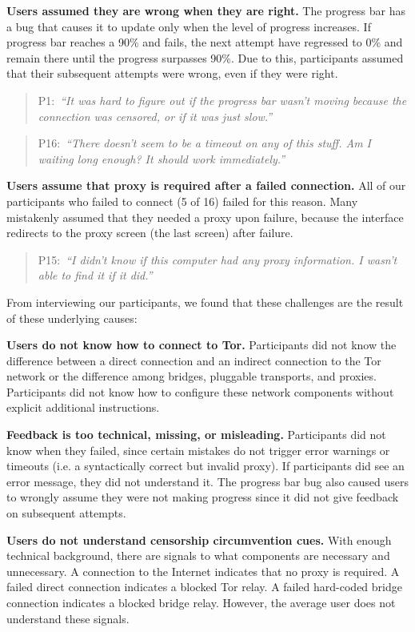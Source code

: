 \documentclass[USenglish,oneside,twocolumn]{article}
\newcommand{\pquote}[2]{
\begin{quotation}
\noindent #1:~\textit{``#2''}
\end{quotation}
}
\begin{document}
{\begin{description}
\item {\bfseries Users assumed they are wrong when they are right.}
The progress bar has a bug that causes it to update only when the level of progress increases.
If progress bar reaches a 90\% and fails, the next attempt have regressed to 0\% and remain there until the progress surpasses 90\%. Due to this, participants assumed that their subsequent attempts were wrong, even if they were right.

\smallskip
\pquote{P1}{It was hard to figure out if the progress bar wasn't moving because the connection was censored, or if it was just slow.}
\smallskip
\pquote{P16}{There doesn't seem to be a timeout on any of this stuff. Am I waiting long enough? It should work immediately.}
\smallskip

\item {\bfseries Users assume that proxy is required after a failed connection.}
All of our participants who failed to connect (5 of 16) failed for this reason. Many mistakenly assumed that they needed a proxy upon failure, because the interface redirects to the proxy screen (the last screen) after failure. 

\smallskip
\pquote{P15}{I didn't know if this computer had any proxy information. I wasn't able to find it if it did.}
\end{description}

From interviewing our participants, we found that these challenges are the result of these underlying causes: \\

\begin{description}
\item {\bfseries Users do not know how to connect to Tor.} Participants did not know the difference between a direct connection and an indirect connection to the Tor network or the difference among bridges, pluggable transports, and proxies. Participants did not know how to configure these network components without explicit additional instructions. 
\item {\bfseries Feedback is too technical, missing, or misleading.} Participants did not know when they failed, since certain mistakes do not trigger error warnings or timeouts (i.e. a syntactically correct but invalid proxy). If participants did see an error message, they did not understand it. The progress bar bug also caused users to wrongly assume they were not making progress since it did not give feedback on subsequent attempts. 
\item {\bfseries Users do not understand censorship circumvention cues.} With enough technical background, there are  signals to what components are necessary and unnecessary. A connection to the Internet indicates that no proxy is required. A failed direct connection indicates a blocked Tor relay. A failed hard-coded bridge connection indicates a blocked bridge relay. However, the average user does not understand these signals.
\end{description} 

}
\end{document}
